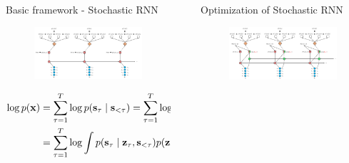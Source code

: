 \documentclass[final]{beamer}
\newlength{\sepwidth}
\newlength{\colwidth}
\newcommand{\separatorcolumn}{\begin{column}{\sepwidth}\end{column}}
\begin{document}
\begin{frame}[t]
\begin{columns}[t]
\begin{column}{\colwidth}
  \begin{block}{Basic framework - Stochastic RNN}
	\begin{figure}
	\includegraphics[width=0.9\linewidth]{fig/SRNN-L4-prior.pdf}
	\end{figure}
	\vspace{-1em}
	\begin{align*}
	\log p({\mathbf{x}}) 
	&= \sum_{\tau=1}^{T} \log p({\mathbf{s}}_{\tau} \mid {\mathbf{s}}_{<\tau}) 
	= \sum_{\tau=1}^{T} \log \int p({\mathbf{s}}_{\tau}, {\mathbf{z}}_\tau \mid {\mathbf{s}}_{<\tau}) d{\mathbf{z}}_\tau && \text{(add ${\mathbf{z}}_\tau$ for each ${\mathbf{s}}_\tau$)} \\
	&= \sum_{\tau=1}^{T} \log \int p({\mathbf{s}}_{\tau} \mid {\mathbf{z}}_\tau , {\mathbf{s}}_{<\tau}) p({\mathbf{z}}_\tau \mid {\mathbf{s}}_{<\tau}) d{\mathbf{z}}_\tau && \text{(product rule)} \\
	\end{align*}
\end{block}
\end{column}

\separatorcolumn

\begin{column}{\colwidth}

  \begin{block}{Optimization of Stochastic RNN}
	\begin{figure}
	\includegraphics[width=0.9\linewidth]{fig/SRNN-L4-ELBO.pdf}
	\end{figure}
  \end{block}


\end{column}
\end{columns}
\end{frame}
\end{document}
